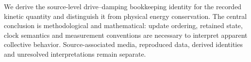 \documentclass[11pt,a4paper,oneside]{report}
\begin{document}
We derive the source-level drive--damping bookkeeping identity for the recorded
kinetic quantity and distinguish it from physical energy conservation. The
central conclusion is methodological and mathematical: update ordering,
retained state, clock semantics and measurement conventions are necessary to
interpret apparent collective behavior. Source-associated media, reproduced
data, derived identities and unresolved interpretations remain separate.

\tableofcontents
\listoffigures
\clearpage
{}






\appendix



\end{document}
